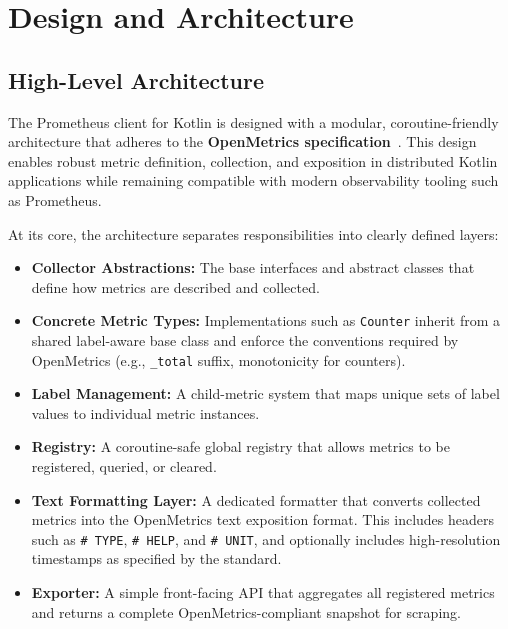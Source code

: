 \chapter{Design and Architecture} \label{ch:architecture}

\section{High-Level Architecture}

The Prometheus client for Kotlin is designed with a modular, coroutine-friendly architecture that adheres to the \textbf{OpenMetrics specification}~\cite{openmetrics-spec}. This design enables robust metric definition, collection, and exposition in distributed Kotlin applications while remaining compatible with modern observability tooling such as Prometheus.

At its core, the architecture separates responsibilities into clearly defined layers:

\begin{itemize}
    \item \textbf{Collector Abstractions:} The base interfaces and abstract classes that define how metrics are described and collected.
    
    \item \textbf{Concrete Metric Types:} Implementations such as \texttt{Counter} inherit from a shared label-aware base class and enforce the conventions required by OpenMetrics (e.g., \texttt{\_total} suffix, monotonicity for counters).
    
    \item \textbf{Label Management:} A child-metric system that maps unique sets of label values to individual metric instances.
    
    \item \textbf{Registry:} A coroutine-safe global registry that allows metrics to be registered, queried, or cleared. 
    
    \item \textbf{Text Formatting Layer:} A dedicated formatter that converts collected metrics into the OpenMetrics text exposition format. This includes headers such as \texttt{\# TYPE}, \texttt{\# HELP}, and \texttt{\# UNIT}, and optionally includes high-resolution timestamps as specified by the standard.
    
    \item \textbf{Exporter:} A simple front-facing API that aggregates all registered metrics and returns a complete OpenMetrics-compliant snapshot for scraping.
\end{itemize}

